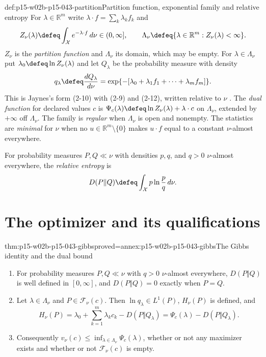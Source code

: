 \begin{hbdefinition}{def:p15-w02b-p15-043-partition}{Partition function, exponential family and relative entropy}
For \(\lambda\in\mathbb R^m\) write \(\lambda\cdot f=\sum_k\lambda_kf_k\) and
\[
 Z_\nu(\lambda)\defeq\int_{\mathcal X}e^{-\lambda\cdot f}\,d\nu\in(0,\infty],
 \qquad
 \Lambda_\nu\defeq\{\lambda\in\mathbb R^m:Z_\nu(\lambda)<\infty\}.
\]
\(Z_\nu\) is the \emph{partition function} and \(\Lambda_\nu\) its domain,
which may be empty. For \(\lambda\in\Lambda_\nu\) put
\(\lambda_0\defeq\ln Z_\nu(\lambda)\) and let \(Q_\lambda\) be the
probability measure with density
\[
 q_\lambda\defeq\frac{dQ_\lambda}{d\nu}
   =\exp\{-[\lambda_0+\lambda_1f_1+\cdots+\lambda_mf_m]\}.
\]
This is Jaynes's form (2-10) with (2-9) and (2-12), written relative to
\(\nu\) \cite[p.~623]{Jaynes1957InformationTheory}. The \emph{dual function}
for declared values \(c\) is \(\Psi_c(\lambda)\defeq\ln Z_\nu(\lambda)+\lambda\cdot c\)
on \(\Lambda_\nu\), extended by \(+\infty\) off \(\Lambda_\nu\).
The family is \emph{regular} when \(\Lambda_\nu\) is open and nonempty.
The statistics are \emph{minimal} for \(\nu\) when no
\(u\in\mathbb R^m\setminus\{0\}\) makes \(u\cdot f\) equal to a constant
\(\nu\)-almost everywhere.

For probability measures \(P,Q\ll\nu\) with densities \(p,q\), and
\(q>0\) \(\nu\)-almost everywhere, the \emph{relative entropy} is
\[
 D(P\Vert Q)\defeq\int_{\mathcal X}p\ln\frac pq\,d\nu .
\]
\end{hbdefinition}

\section{The optimizer and its qualifications}
\label{sec:p15-w02b-p15-043-optimizer}

\begin{hbtheorem}{thm:p15-w02b-p15-043-gibbs}{proved=annex:p15-w02b-p15-043-gibbs}{The Gibbs identity and the dual bound}
\begin{enumerate}
\item For probability measures \(P,Q\ll\nu\) with \(q>0\)
\(\nu\)-almost everywhere, \(D(P\Vert Q)\) is well defined in \([0,\infty]\),
and \(D(P\Vert Q)=0\) exactly when \(P=Q\).
\item Let \(\lambda\in\Lambda_\nu\) and \(P\in\mathcal F_\nu(c)\). Then
\(\ln q_\lambda\in L^1(P)\), \(H_\nu(P)\) is defined, and
\[
 H_\nu(P)=\lambda_0+\sum_{k=1}^m\lambda_kc_k-D(P\Vert Q_\lambda)
        =\Psi_c(\lambda)-D(P\Vert Q_\lambda).
\]
\item Consequently \(v_\nu(c)\leq\inf_{\lambda\in\Lambda_\nu}\Psi_c(\lambda)\),
whether or not any maximizer exists and whether or not
\(\mathcal F_\nu(c)\) is empty.
\end{enumerate}
\end{hbtheorem}

